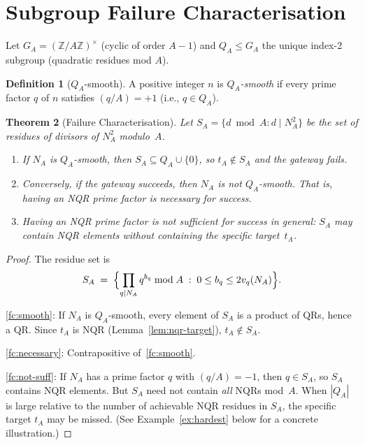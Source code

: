 \documentclass[12pt]{amsart}
\newtheorem{theorem}{Theorem}[section]
\theoremstyle{definition}
\newtheorem{definition}[theorem]{Definition}
\theoremstyle{remark}
\begin{document}
\section{Subgroup Failure Characterisation}\label{sec:failure}

Let $G_A = (\mathbb{Z}/A\mathbb{Z})^\times$ (cyclic of order $A-1$)
and $Q_A \le G_A$ the unique index-2 subgroup (quadratic residues mod $A$).

\begin{definition}[$Q_A$-smooth]
A positive integer $n$ is \emph{$Q_A$-smooth} if every prime factor $q$ of $n$
satisfies $(q/A) = +1$ (i.e., $q \in Q_A$).
\end{definition}

\begin{theorem}[Failure Characterisation]\label{thm:failure-char}
Let $S_A = \{d \bmod A : d \mid N_A^2\}$ be the set of residues of
divisors of $N_A^2$ modulo~$A$.
\begin{enumerate}[label=\textup{(\roman*)}]
  \item\label{fc:smooth} If $N_A$ is $Q_A$-smooth, then $S_A \subseteq Q_A \cup \{0\}$,
    so $t_A \notin S_A$ and the gateway fails.
  \item\label{fc:necessary} Conversely, if the gateway succeeds,
    then $N_A$ is not $Q_A$-smooth.
    That is, having an NQR prime factor is \emph{necessary} for success.
  \item\label{fc:not-suff} Having an NQR prime factor is \emph{not sufficient}
    for success in general: $S_A$ may contain NQR elements without
    containing the specific target~$t_A$.
\end{enumerate}
\end{theorem}

\begin{proof}
The residue set is
\[
  S_A \;=\;\Bigl\{\prod_{q \mid N_A} q^{b_q} \bmod A \;:\; 0 \le b_q \le 2v_q(N_A)\Bigr\}.
\]

\ref{fc:smooth}: If $N_A$ is $Q_A$-smooth, every element of $S_A$ is a product
of QRs, hence a QR.
Since $t_A$ is NQR (Lemma~\ref{lem:nqr-target}), $t_A \notin S_A$.

\ref{fc:necessary}: Contrapositive of~\ref{fc:smooth}.

\ref{fc:not-suff}: If $N_A$ has a prime factor $q$ with $(q/A) = -1$,
then $q \in S_A$, so $S_A$ contains NQR elements.
But $S_A$ need not contain \emph{all} NQRs mod~$A$.
When $|Q_A|$ is large relative to the number of achievable
NQR residues in $S_A$, the specific target $t_A$ may be missed.
(See Example~\ref{ex:hardest} below for a concrete illustration.)
\end{proof}
\end{document}
